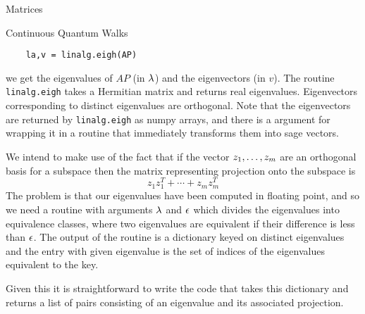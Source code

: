 \begin{chap}{Matrices}
\begin{sect}{Continuous Quantum Walks}
\begin{para}
\end{para}
%
\begin{verbatim}
    la,v = linalg.eigh(AP)
\end{verbatim}
%
\begin{para}
we get the eigenvalues of $AP$ (in $\lambda$) and the eigenvectors (in \(v\)).
The routine \verb|linalg.eigh| takes a Hermitian matrix and returns real eigenvalues.
Eigenvectors corresponding to distinct eigenvalues are orthogonal. Note that the
eigenvectors are returned by
\verb|linalg.eigh| as numpy arrays, and there is a argument for
wrapping it in a routine that immediately transforms them into sage vectors.
\end{para}
%
\begin{para}
We intend to make use of the fact that if the vector $z_{1},\ldots,z_{m}$ are an orthogonal basis
for a subspace then the matrix representing projection onto the subspace is
\[
    z_1z_1^T+\cdots+z_mz_m^T
\]
The problem is that our eigenvalues have been computed in floating point, and
so we need a routine with arguments $\lambda$ and $\epsilon$ which divides the
eigenvalues into equivalence classes, where two eigenvalues are equivalent if their
difference is less than $\epsilon$. The output of the routine
is a dictionary keyed on distinct eigenvalues and the entry with given eigenvalue
is the set of indices of the eigenvalues equivalent to the key.
\end{para}
%
\begin{para}
Given this it is straightforward to write the code that takes this dictionary and
returns a list of pairs consisting of an eigenvalue and its associated projection.
\end{para}
%
\end{sect}
%
\end{chap}